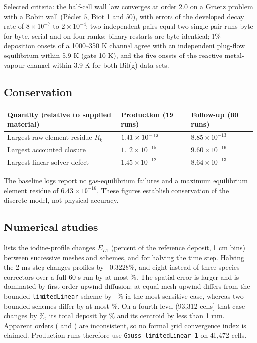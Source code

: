 \documentclass[11pt,a4paper]{article}
\begin{document}
Selected criteria: the half-cell wall law converges at order 2.0 on a
Graetz problem with a Robin wall (P\'eclet 5, Biot 1 and 50), with
errors of the developed decay rate of $8\times10^{-7}$ to
$2\times10^{-4}$; two independent pairs equal two single-pair runs byte
for byte, serial and on four ranks; binary restarts are byte-identical;
1\% deposition onsets of a 1000--350 K channel agree with an independent
plug-flow equilibrium within 5.9 K (gate 10 K), and the five onsets of
the reactive metal-vapour channel within 3.9 K for both BiI(g) data
sets.

\subsection{Conservation}

\begin{center}
\small
\begin{tabular}{lll}
\toprule
Quantity (relative to supplied material) & Production (19 runs) &
  Follow-up (60 runs)\\
\midrule
Largest raw element residue $R_k$ & $1.41\times10^{-12}$ &
  $8.85\times10^{-13}$\\
Largest accounted closure & $1.12\times10^{-15}$ & $9.60\times10^{-16}$\\
Largest linear-solver defect & $1.45\times10^{-12}$ & $8.64\times10^{-13}$\\
\bottomrule
\end{tabular}
\end{center}
The baseline logs report no gas-equilibrium failures and a maximum
equilibrium element residue of $6.43\times10^{-16}$. These figures
establish conservation of the discrete model, not physical accuracy.

\subsection{Numerical studies}
\label{sec:numstudies}

 lists the iodine-profile changes $E_{L1}$ (percent
of the reference deposit, 1 cm bins) between successive meshes and
schemes, and for halving the time step. Halving the 2 ms step changes
profiles by \TimeMin--0.3228\%, and eight instead of three species
correctors over a full 60 s run by at most \IterSteelHigh\%. The spatial
error is larger and is dominated by first-order upwind diffusion: at
equal mesh upwind differs from the bounded \texttt{limitedLinear} scheme
by \UpLLFour--\UpLLOne\% in the most sensitive case, whereas two bounded
schemes differ by at most \VLSteelMax\%. On a fourth level (93,312
cells) that case changes by \SteelLLThree\%, its total deposit by
\SteelTotalThree\% and its centroid by less than 1 mm. Apparent orders
(\SteelOrderOne{} and \SteelOrderTwo) are inconsistent, so no formal grid
convergence index is claimed. Production runs therefore use
\texttt{Gauss limitedLinear 1} on 41,472 cells.
\end{document}
